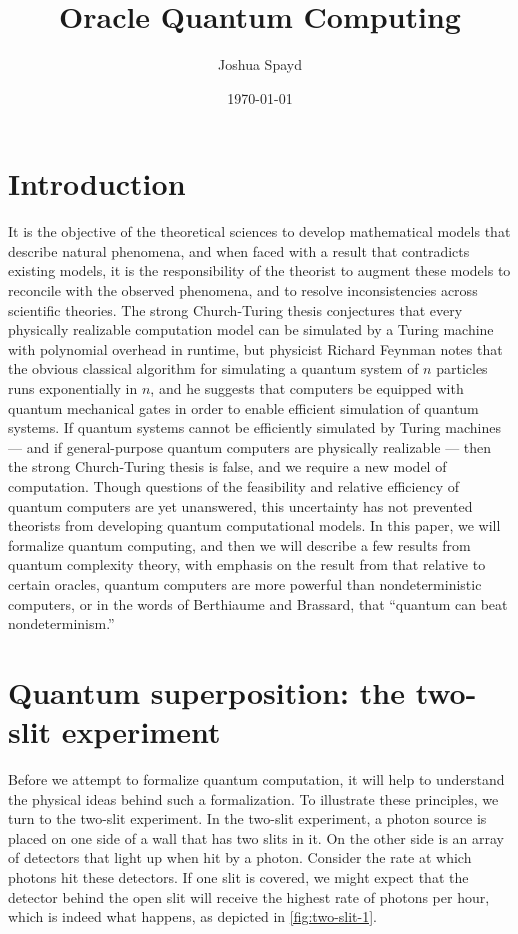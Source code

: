 \documentclass[12pt]{article}
\title{Oracle Quantum Computing}
\author{Joshua Spayd}
\date{\today}
\begin{document}
\maketitle

\section{Introduction}
It is the objective of the theoretical sciences to develop mathematical models
that describe natural phenomena, and when faced with a result that contradicts
existing models, it is the responsibility of the theorist to augment these
models to reconcile with the observed phenomena, and to resolve
inconsistencies across scientific theories. The strong Church-Turing thesis
conjectures that every physically realizable computation model can be
simulated by a Turing machine with polynomial overhead in runtime, but
physicist Richard Feynman \cite{Fey82} notes that the obvious classical
algorithm for simulating a quantum system of $n$ particles runs exponentially
in $n$, and he suggests that computers be equipped with quantum mechanical gates
in order to enable efficient simulation of quantum systems. If quantum systems
cannot be efficiently simulated by Turing machines --- and if general-purpose
quantum computers are physically realizable --- then the strong Church-Turing
thesis is false, and we require a new model of computation. Though questions
of the feasibility and relative efficiency of quantum computers are yet
unanswered, this uncertainty has not prevented theorists from developing
quantum computational models. In this paper, we will formalize quantum
computing, and then we will describe a few results from quantum complexity
theory, with emphasis on the result from \cite{BB92a} that relative to certain
oracles, quantum computers are more powerful than nondeterministic computers, or
in the words of  Berthiaume and Brassard, that ``quantum can beat
nondeterminism.''


\section{Quantum superposition: the two-slit experiment}
Before we attempt to formalize quantum computation, it will help to understand
the physical ideas behind such a formalization. To illustrate these principles,
we turn to the two-slit experiment. In the two-slit experiment, a photon source
is placed on one side of a wall that has two slits in it. On the other side is
an array of detectors that light up when hit by a photon. Consider the rate at
which photons hit these detectors. If one slit is covered, we might expect that
the detector behind the open slit will receive the highest rate of photons per
hour, which is indeed what happens, as depicted in \cref{fig:two-slit-1}.
\end{document}
